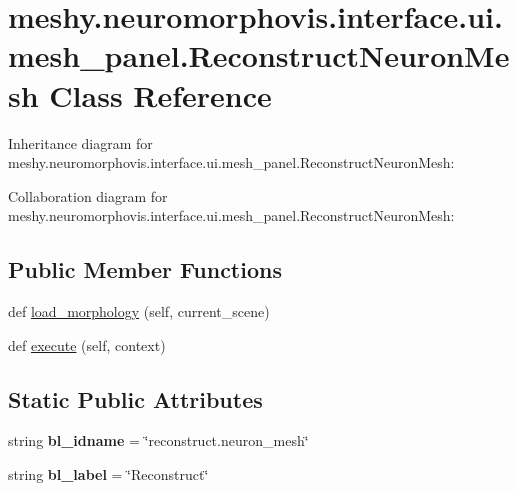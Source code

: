 \hypertarget{classmeshy_1_1neuromorphovis_1_1interface_1_1ui_1_1mesh__panel_1_1ReconstructNeuronMesh}{}\section{meshy.\+neuromorphovis.\+interface.\+ui.\+mesh\+\_\+panel.\+Reconstruct\+Neuron\+Mesh Class Reference}
\label{classmeshy_1_1neuromorphovis_1_1interface_1_1ui_1_1mesh__panel_1_1ReconstructNeuronMesh}


Inheritance diagram for meshy.\+neuromorphovis.\+interface.\+ui.\+mesh\+\_\+panel.\+Reconstruct\+Neuron\+Mesh\+:


Collaboration diagram for meshy.\+neuromorphovis.\+interface.\+ui.\+mesh\+\_\+panel.\+Reconstruct\+Neuron\+Mesh\+:
\subsection*{Public Member Functions}
\begin{DoxyCompactItemize}
\item 
def \hyperlink{classmeshy_1_1neuromorphovis_1_1interface_1_1ui_1_1mesh__panel_1_1ReconstructNeuronMesh_ad6fd48373866ff1b2968689dcaeae69a}{load\+\_\+morphology} (self, current\+\_\+scene)
\item 
def \hyperlink{classmeshy_1_1neuromorphovis_1_1interface_1_1ui_1_1mesh__panel_1_1ReconstructNeuronMesh_a0f58c2c1b41ed6b96c52baa39f7b2fd7}{execute} (self, context)
\end{DoxyCompactItemize}
\subsection*{Static Public Attributes}
\begin{DoxyCompactItemize}
\item 
string {\bfseries bl\+\_\+idname} = \char`\"{}reconstruct.\+neuron\+\_\+mesh\char`\"{}\hypertarget{classmeshy_1_1neuromorphovis_1_1interface_1_1ui_1_1mesh__panel_1_1ReconstructNeuronMesh_a1ffb90bac60438e0652c4164d62944db}{}\label{classmeshy_1_1neuromorphovis_1_1interface_1_1ui_1_1mesh__panel_1_1ReconstructNeuronMesh_a1ffb90bac60438e0652c4164d62944db}

\item 
string {\bfseries bl\+\_\+label} = \char`\"{}Reconstruct\char`\"{}\hypertarget{classmeshy_1_1neuromorphovis_1_1interface_1_1ui_1_1mesh__panel_1_1ReconstructNeuronMesh_a7a4324d39e7f577406bcd809e51af8ca}{}\label{classmeshy_1_1neuromorphovis_1_1interface_1_1ui_1_1mesh__panel_1_1ReconstructNeuronMesh_a7a4324d39e7f577406bcd809e51af8ca}

\end{DoxyCompactItemize}


